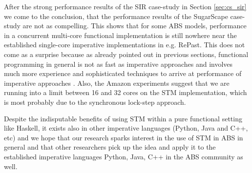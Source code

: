 After the strong performance results of the SIR case-study in Section \ref{sec:cs_sir} we come to the conclusion, that the performance results of the SugarScape case-study are not as compelling. This shows that for some ABS models, performance in a concurrent multi-core functional implementation is still nowhere near the established single-core imperative implementations in e.g. RePast. This does not come as a surprise because as already pointed out in previous sections, functional programming in general is not as fast as imperative approaches and involves much more experience and sophisticated techniques to arrive at performance of imperative approaches \cite{kqr_competing_2017}. Also, the Amazon experiments suggest that we are running into a limit between 16 and 32 cores on the STM implementation, which is most probably due to the synchronous lock-step approach.

Despite the indisputable benefits of using STM within a pure functional setting like Haskell, it exists also in other imperative languages (Python, Java and C++, etc) and we hope that our research sparks interest in the use of STM in ABS in general and that other researchers pick up the idea and apply it to the established imperative languages Python, Java, C++ in the ABS community as well.